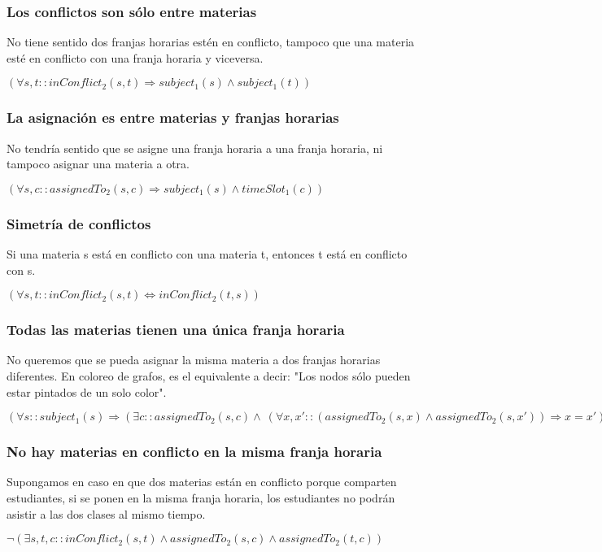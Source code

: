 \documentclass[a4paper,11pt]{article}
\begin{document}
\subsubsection{Los conflictos son sólo entre materias}
No tiene sentido dos franjas horarias estén en conflicto, tampoco que una materia esté en conflicto con una franja horaria y viceversa.
\begin{center}
    $(\forall s, t :: inConflict_2(s,t) \Rightarrow subject_1(s) \land subject_1(t) )$
\end{center}

\subsubsection{La asignación es entre materias y franjas horarias}
No tendría sentido que se asigne una franja horaria a una franja horaria, ni tampoco asignar una materia a otra.
\begin{center}
    $(\forall s, c :: assignedTo_2(s, c) \Rightarrow subject_1(s) \land timeSlot_1(c))$
\end{center}

\subsubsection{Simetría de conflictos}
Si una materia s está en conflicto con una materia t, entonces t está en conflicto con s.
\begin{center}
    $(\forall s, t :: inConflict_2(s,t) \Leftrightarrow inConflict_2(t, s))$
\end{center}

\subsubsection{Todas las materias tienen una única franja horaria}
No queremos que se pueda asignar la misma materia a dos franjas horarias diferentes. En coloreo de grafos, es el equivalente a decir: "Los nodos sólo pueden estar pintados de un solo color".
\begin{center}
    $(\forall s :: subject_1(s) \Rightarrow (\exists c :: assignedTo_2(s, c) \land \
        (\forall x, x' :: (assignedTo_2(s, x) \land assignedTo_2(s, x')) \Rightarrow x = x' )
        ))$
\end{center}

\subsubsection{No hay materias en conflicto en la misma franja horaria}
Supongamos en caso en que dos materias están en conflicto porque comparten estudiantes, si se ponen en la misma franja horaria, los estudiantes no podrán asistir a las dos clases al mismo tiempo.
\begin{center}
    $\neg(\exists s, t, c :: inConflict_2(s, t) \land assignedTo_2(s, c) \land assignedTo_2(t, c) )$
\end{center}
\end{document}
